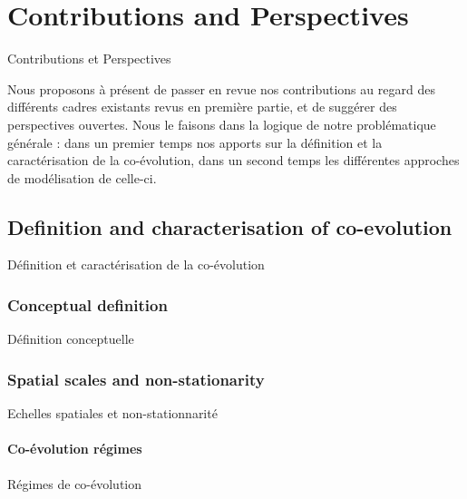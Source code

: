 




\newpage


\section{Contributions and Perspectives}{Contributions et Perspectives}

\label{sec:contributions}



Nous proposons à présent de passer en revue nos contributions au regard des différents cadres existants revus en première partie, et de suggérer des perspectives ouvertes. Nous le faisons dans la logique de notre problématique générale : dans un premier temps nos apports sur la définition et la caractérisation de la co-évolution, dans un second temps les différentes approches de modélisation de celle-ci.



\subsection{Definition and characterisation of co-evolution}{Définition et caractérisation de la co-évolution}




\subsubsection{Conceptual definition}{Définition conceptuelle}






\subsubsection{Spatial scales and non-stationarity}{Echelles spatiales et non-stationnarité}






\paragraph{Co-évolution régimes}{Régimes de co-évolution}

